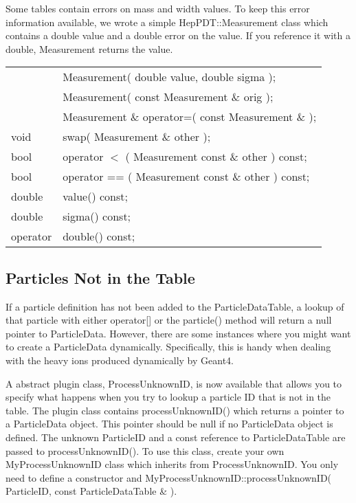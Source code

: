 Some tables contain errors on mass and width values.
To keep this error information available, we wrote a simple HepPDT::Measurement
class which contains a double value and a double error on the value.
If you reference it with a double, Measurement returns the value.

\begin{center}
\begin{tabular}{ll}
 & Measurement( double value, double sigma ); \\
 & Measurement( const Measurement \& orig );  \\
 & Measurement \& operator=( const Measurement \& );  \\
void & swap( Measurement \& other );  \\
bool  & operator $<$  ( Measurement const \& other ) const;  \\
bool   & operator == ( Measurement const \& other ) const;  \\
   double  &  value()  const;\\
   double   & sigma()  const;\\
   operator & double() const;\\
\end{tabular}
\end{center}

\subsection{ Particles Not in the Table }

If a particle definition has not been added to the ParticleDataTable,
a lookup of that particle with either operator[] or the particle() method
will return a null pointer to ParticleData.   However, there are some instances
where you might want to create a ParticleData dynamically.  Specifically,
this is handy when dealing with the heavy ions produced dynamically by
Geant4.

A abstract plugin class, ProcessUnknownID, is now available that allows you
to specify what happens when you try to lookup a particle ID that is not
in the table.  The plugin class contains processUnknownID() which returns
a pointer to a ParticleData object.  
This pointer should be null if no ParticleData object is defined.
The unknown ParticleID and a const reference to ParticleDataTable are 
passed to processUnknownID().
To use this class, create your own MyProcessUnknownID class
which inherits from ProcessUnknownID.  
You only need to define a constructor and 
MyProcessUnknownID::processUnknownID( ParticleID,  const ParticleDataTable \& ).

